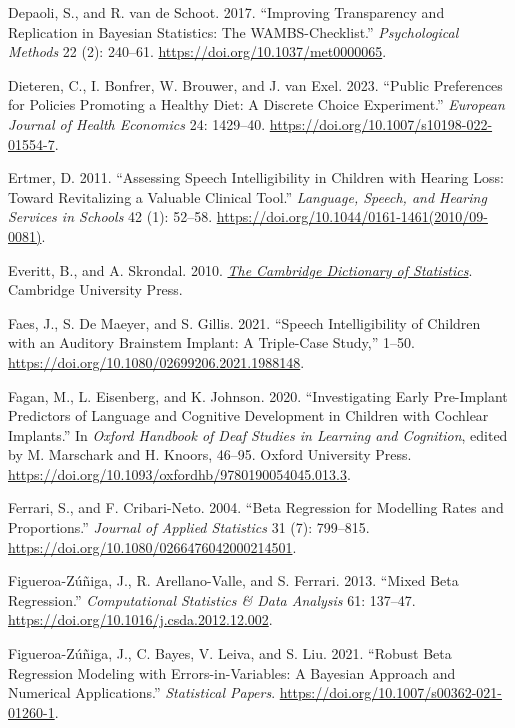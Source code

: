 \documentclass[
sn-apacite
]{sn-jnl}
\newlength{\cslhangindent}
\newenvironment{CSLReferences}[2] %
 {\begin{list}{}{%
  \setlength{\itemindent}{0pt}
  \setlength{\leftmargin}{0pt}
  \setlength{\parsep}{0pt}
  \ifodd #1
   \setlength{\leftmargin}{\cslhangindent}
   \setlength{\itemindent}{-1\cslhangindent}
  \fi
  \setlength{\itemsep}{#2\baselineskip}}}
 {\end{list}}
\begin{document}
\begin{CSLReferences}{1}{0}
Depaoli, S., and R. van de Schoot. 2017. {``Improving Transparency and
Replication in Bayesian Statistics: The WAMBS-Checklist.''}
\emph{Psychological Methods} 22 (2): 240--61.
\url{https://doi.org/10.1037/met0000065}.

Dieteren, C., I. Bonfrer, W. Brouwer, and J. van Exel. 2023. {``Public
Preferences for Policies Promoting a Healthy Diet: A Discrete Choice
Experiment.''} \emph{European Journal of Health Economics} 24: 1429--40.
\url{https://doi.org/10.1007/s10198-022-01554-7}.

Ertmer, D. 2011. {``Assessing Speech Intelligibility in Children with
Hearing Loss: Toward Revitalizing a Valuable Clinical Tool.''}
\emph{Language, Speech, and Hearing Services in Schools} 42 (1): 52--58.
\url{https://doi.org/10.1044/0161-1461(2010/09-0081)}.

Everitt, B., and A. Skrondal. 2010. \emph{\href{}{The Cambridge
Dictionary of Statistics}}. Cambridge University Press.

Faes, J., S. De Maeyer, and S. Gillis. 2021. {``Speech Intelligibility
of Children with an Auditory Brainstem Implant: A Triple-Case Study,''}
1--50. \url{https://doi.org/10.1080/02699206.2021.1988148}.

Fagan, M., L. Eisenberg, and K. Johnson. 2020. {``Investigating Early
Pre-Implant Predictors of Language and Cognitive Development in Children
with Cochlear Implants.''} In \emph{Oxford Handbook of Deaf Studies in
Learning and Cognition}, edited by M. Marschark and H. Knoors, 46--95.
Oxford University Press.
\url{https://doi.org/10.1093/oxfordhb/9780190054045.013.3}.

Ferrari, S., and F. Cribari-Neto. 2004. {``Beta Regression for Modelling
Rates and Proportions.''} \emph{Journal of Applied Statistics} 31 (7):
799--815. \url{https://doi.org/10.1080/0266476042000214501}.

Figueroa-Zúñiga, J., R. Arellano-Valle, and S. Ferrari. 2013. {``Mixed
Beta Regression.''} \emph{Computational Statistics \& Data Analysis} 61:
137--47. \url{https://doi.org/10.1016/j.csda.2012.12.002}.

Figueroa-Zúñiga, J., C. Bayes, V. Leiva, and S. Liu. 2021. {``Robust
Beta Regression Modeling with Errors-in-Variables: A Bayesian Approach
and Numerical Applications.''} \emph{Statistical Papers}.
\url{https://doi.org/10.1007/s00362-021-01260-1}.


\end{CSLReferences}
\end{document}
